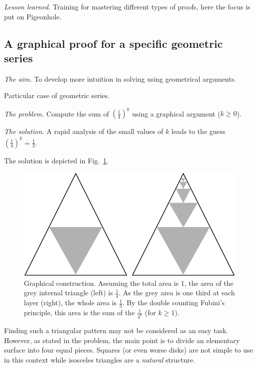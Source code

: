 \noindent \textit{Lesson learned.}
Training for mastering different types of proofs, here the focus is put on Pigeonhole.



\subsection{A graphical proof for a specific geometric series}

\noindent \textit{The aim.}
To develop more intuition in solving using geometrical arguments.

Particular case of geometric series.
\medskip

\noindent \textit{The problem.}
Compute the sum of $(\frac{1}{4})^k$ using a graphical argument ($k \geq 0$).
\medskip

\noindent \textit{The solution.}
A rapid analysis of the small values of $k$ leads to the guess $(\frac{1}{4})^k = \frac{1}{3}$.
 
The solution is depicted in Fig.~\ref{Fig:Sumgeo1sur4}. 
\begin{figure}
\begin{center}
        \includegraphics[scale=0.3]{FiguresArithmetic/SumGeometric1sur4}
        \caption{Graphical construction. Assuming the total area is 1, the area of the grey internal triangle (left) is $\frac{1}{4}$.
        As the grey area is one third at each layer (right), the whole area is $\frac{1}{3}$.
        By the double counting Fubini's principle, this area is the sum of the $\frac{1}{4^k}$ (for $k \geq 1$).}
        \label{Fig:Sumgeo1sur4}
\end{center}
\end{figure}

Finding such a triangular pattern may not be considered as an easy task.
However, as stated in the problem, the main point is to divide an elementary surface
into four equal pieces. 
Squares (or even worse disks) are not simple to use in this context while isosceles triangles 
are a \textit{natural} structure. 
\medskip

